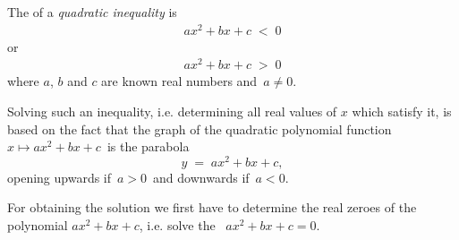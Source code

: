 \documentclass[12pt]{article}
\theoremstyle{definition}
\begin{document}
The  of a {\em quadratic inequality} is
\begin{align}
   ax^2\!+\!bx\!+\!c \;<\; 0
\end{align}
or 
\begin{align}
   ax^2\!+\!bx\!+\!c \;>\; 0
\end{align}
where $a$, $b$ and $c$ are known real numbers and\, $a \neq 0$.

Solving such an inequality, i.e. determining all real values of $x$ which satisfy it, is based on the fact that the graph of the quadratic polynomial function\, $x\mapsto ax^2\!+\!bx\!+\!c$\, is the parabola
    $$y \;=\; ax^2\!+\!bx\!+\!c,$$
opening upwards if\, $a > 0$\, and downwards if\, $a < 0$.

For obtaining the solution we first have to determine the real zeroes of the polynomial $ax^2\!+\!bx\!+\!c$, i.e. solve the \, 
$ax^2\!+\!bx\!+\!c = 0$.
\end{document}
